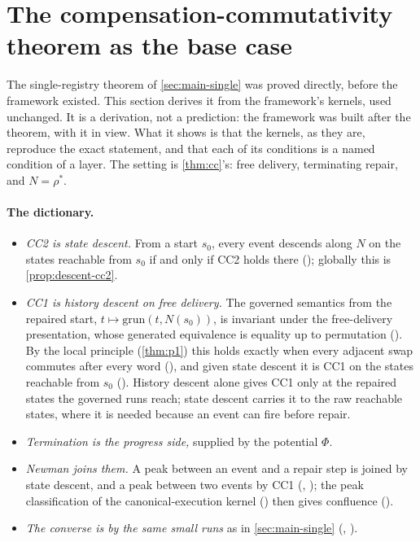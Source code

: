 
\section{The compensation-commutativity theorem as the base case}\label{sec:base-case}

The single-registry theorem of \cref{sec:main-single} was proved directly, before the framework
existed. This section derives it from the framework's kernels, used unchanged. It is a derivation, not
a prediction: the framework was built after the theorem, with it in view. What it shows is that the
kernels, as they are, reproduce the exact statement, and that each of its conditions is a named
condition of a layer. The setting is \cref{thm:cc}'s: free delivery, terminating repair, and
$N = \rho^{*}$.

\paragraph{The dictionary.}
\begin{itemize}[nosep]
  \item \emph{CC2 is state descent.} From a start $s_0$, every event descends along $N$ on the states
    reachable from $s_0$ if and only if CC2 holds there (); globally this is
    \cref{prop:descent-cc2}.
  \item \emph{CC1 is history descent on free delivery.} The governed semantics from the repaired start,
    $t \mapsto \mathrm{grun}(t, N(s_0))$, is invariant under the free-delivery presentation, whose
    generated equivalence is equality up to permutation (). By the local
    principle (\cref{thm:p1}) this holds exactly when every adjacent swap commutes after every word
    (), and given state descent it is CC1 on the states reachable from $s_0$
    (). History descent alone gives CC1 only at the repaired states the governed
    runs reach; state descent carries it to the raw reachable states, where it is needed because an
    event can fire before repair.
  \item \emph{Termination is the progress side,} supplied by the potential $\Phi$.
  \item \emph{Newman joins them.} A peak between an event and a repair step is joined by state descent,
    and a peak between two events by CC1 (, ); the
    peak classification of the canonical-execution kernel () then gives
    confluence ().
  \item \emph{The converse is by the same small runs} as in \cref{sec:main-single}
    (, ).
\end{itemize}


